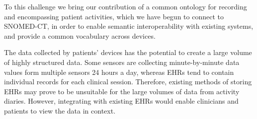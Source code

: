 \documentclass{chi-ext}
\begin{document}
To this challenge we bring our contribution of a common ontology for recording and encompassing patient activities, which we have begun to
connect to SNOMED-CT, in order to enable semantic interoperability with existing systems, and provide a common vocabulary across devices.

The data collected by patients' devices has the potential to create a large volume of highly structured data. Some sensors
are collecting minute-by-minute data values form multiple sensors 24 hours a day, whereas 
EHRs tend to contain individual records for each clinical session. Therefore, existing methods of storing EHRs may
prove to be unsuitable for the large volumes of data from activity diaries. However, integrating with existing EHRs
would enable clinicians and patients to view the data in context. 





\end{document}
